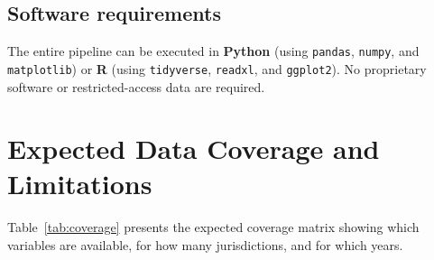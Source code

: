\documentclass[12pt,a4paper]{article}
\begin{document}
\subsection{Software requirements}

The entire pipeline can be executed in \textbf{Python} (using \texttt{pandas}, \texttt{numpy}, and \texttt{matplotlib}) or \textbf{R} (using \texttt{tidyverse}, \texttt{readxl}, and \texttt{ggplot2}).
No proprietary software or restricted-access data are required.


\section{Expected Data Coverage and Limitations}\label{sec:coverage}

Table~\ref{tab:coverage} presents the expected coverage matrix showing which variables are available, for how many jurisdictions, and for which years.
\end{document}
